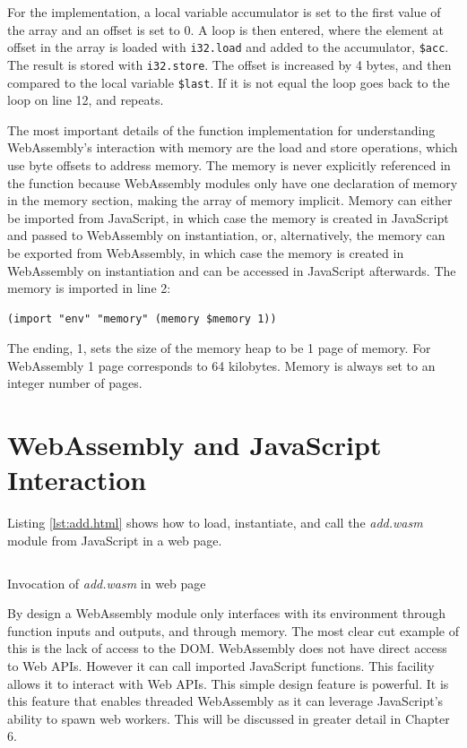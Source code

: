 \documentclass[11pt]{book}
\begin{document}
For the implementation, a local variable accumulator is set to the first value of the array and an offset is set to 0. A loop is then entered, where the element at offset in the array is loaded with \texttt{i32.load} and added to the accumulator, \texttt{\$acc}. The result is stored with \texttt{i32.store}. The offset is increased by 4 bytes, and then compared to the local variable \texttt{\$last}. If it is not equal the loop goes back to the loop on line 12, and repeats.

The most important details of the function implementation for understanding WebAssembly's interaction with memory are the load and store operations, which use byte offsets to address memory. The memory is never explicitly referenced in the function because WebAssembly modules only have one declaration of memory in the memory section, making the array of memory implicit. Memory can either be imported from JavaScript, in which case the memory is created in JavaScript and passed to WebAssembly on instantiation, or, alternatively, the memory can be exported from WebAssembly, in which case the memory is created in WebAssembly on instantiation and can be accessed in JavaScript afterwards. The memory is imported in line 2:
\begin{verbatim}
(import "env" "memory" (memory $memory 1))
\end{verbatim}
The ending, 1, sets the size of the memory heap to be 1 page of memory. For WebAssembly 1 page corresponds to 64 kilobytes. Memory is always set to an integer number of pages.


\section{WebAssembly and JavaScript Interaction}


Listing \ref{lst:add.html} shows how to load, instantiate, and call the \textit{add.wasm} module from JavaScript in a web page.
\begin{listing}[h] 
\inputminted[fontsize=\small,baselinestretch=0.5,linenos]{HTML}{code/examples/wasm/add.html}
\caption{Invocation of \textit{add.wasm} in web page}
\label{lst:add.html}    
\end{listing} 


By design a WebAssembly module only interfaces with its environment through function inputs and outputs, and through memory. 
The most clear cut example of this is the lack of access to the DOM. 
WebAssembly does not have direct access to Web APIs. However it can call imported JavaScript functions. This facility allows it to interact with Web APIs. This simple design feature is powerful. It is this feature that enables threaded WebAssembly as it can leverage JavaScript's ability to spawn web workers. This will be discussed in greater detail in Chapter 6. %
\end{document}
